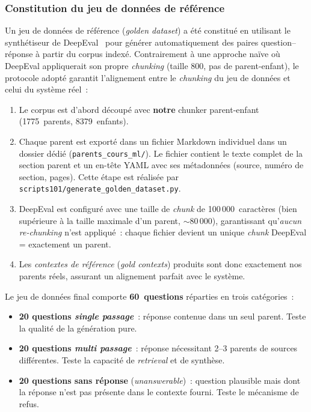 \documentclass[11pt,a4paper]{article}
\begin{document}
\subsubsection{Constitution du jeu de données de référence}

Un jeu de données de référence (\textit{golden dataset}) a été constitué en utilisant le synthétiseur de DeepEval~\cite{deepeval2024} pour générer automatiquement des paires question--réponse à partir du corpus indexé. Contrairement à une approche naïve où DeepEval appliquerait son propre \textit{chunking} (taille 800, pas de parent-enfant), le protocole adopté garantit l'alignement entre le \textit{chunking} du jeu de données et celui du système réel~:

\begin{enumerate}
  \item Le corpus est d'abord découpé avec \textbf{notre} chunker parent-enfant (1775~parents, 8379~enfants).
  \item Chaque parent est exporté dans un fichier Markdown individuel dans un dossier dédié (\texttt{parents\_cours\_ml/}). Le fichier contient le texte complet de la section parent et un en-tête YAML avec ses métadonnées (source, numéro de section, pages). Cette étape est réalisée par \texttt{scripts101/generate\_golden\_dataset.py}.
  \item DeepEval est configuré avec une taille de \textit{chunk} de 100\,000~caractères (bien supérieure à la taille maximale d'un parent, $\sim$80\,000), garantissant qu'\textit{aucun re-chunking} n'est appliqué~: chaque fichier devient un unique \textit{chunk} DeepEval = exactement un parent.
  \item Les \textit{contextes de référence} (\textit{gold contexts}) produits sont donc exactement nos parents réels, assurant un alignement parfait avec le système.
\end{enumerate}

Le jeu de données final comporte \textbf{60~questions} réparties en trois catégories~:
\begin{itemize}
  \item \textbf{20 questions \textit{single passage}}~: réponse contenue dans un seul parent. Teste la qualité de la génération pure.
  \item \textbf{20 questions \textit{multi passage}}~: réponse nécessitant 2--3 parents de sources différentes. Teste la capacité de \textit{retrieval} et de synthèse.
  \item \textbf{20 questions sans réponse} (\textit{unanswerable})~: question plausible mais dont la réponse n'est pas présente dans le contexte fourni. Teste le mécanisme de refus.
\end{itemize}
\end{document}
